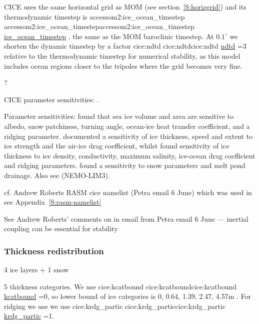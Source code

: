 \documentclass[11pt]{article}
\makeatletter
\newcommand{\TODO}[1]{\note{\textcolor{blue}{\textsf{\textbf{TODO: #1}}}}}
\newcommand*{\make@hex@label}[1]{%
  \def\hex@label{#1}%
  \@onelevel@sanitize\hex@label
  \EdefEscapeHex\hex@label{\hex@label}%
}
\newcommand*{\hexhyperlink}[2]{%
  \make@hex@label{#1}%
  \hyperlink{\hex@label}{#2}%
}
\newcommand{\cicelink}[2]{\hexhyperlink{cice:#2}{#1}}
\newcommand{\accessomlink}[2]{\hexhyperlink{accessom2:#2}{#1}}
\newcommand{\param}[1]{\textsf{#1}}
\newcommand{\cice}[1]{\param{\cicelink{#1}{#1}}}
\newcommand{\accessom}[1]{\param{\accessomlink{#1}{#1}}}
\makeatother
\begin{document}
CICE uses the same horizontal grid as MOM (see section~\ref{S:horizgrid}) and its thermodynamic timestep is \accessom{ice_ocean_timestep}, the same as the MOM baroclinic timestep.
At $0.1^\circ$ we shorten the dynamic timestep by a factor \cice{ndtd}=3 relative to the thermodynamic timestep for numerical stability, as this model includes ocean regions closer to the tripoles where the grid becomes very fine.

\citet{BaileyETAL2018a}?

CICE parameter sensitivities: \citet{Hunke2010a}.

Parameter sensitivities: \citet{UotilaOFarrellMarslandBi2012a} found that sea ice volume and area are sensitive to albedo, snow patchiness, turning angle, ocean-ice heat transfer coefficient, and a ridging parameter. 
\citet{MillerLaxonFelthamCresswell2006a} documented a sensitivity of ice thickness, speed and extent to ice strength and the air-ice drag coefficient, whilst \citet{KimHunkeLipscomb2006a} found sensitivity of ice thickness to ice density, conductivity, maximum salinity, ice-ocean drag coefficient and ridging parameters. 
\citet{UrregoBlancoUrbanHunkeTurnerJeffery2016a} found a sensitivity to snow parameters and melt pond drainage.
Also see \citet{MassonnetGoosseFichefetCounillon2014a} (NEMO-LIM3).

cf. Andrew Roberts RASM cice namelist (Petra email 6 June) \TODO{get permisssion}
which was used in \citet{RobertsCraigMaslowskiOsinskiDuvivierHughesNijssenCassanoBrunke2015a, CassanoDuVivierRobertsHughesSeefeldtBrunkeCraigFiselGutowski2017a, HammanNijssenRobertsCraigMaslowskiOsinski2017a, JinDealMaslowskiMatraiRobertsOsinskiLeeFrantsElliott2018a, RobertsHunkeAllardBaileyCraigLemieuxTurner2018a}
see Appendix~\ref{S:rasm-namelist}

See Andrew Roberts' comments on \citet{RobertsCraigMaslowskiOsinskiDuvivierHughesNijssenCassanoBrunke2015a} in email from Petra email 6 June --- inertial coupling can be essential for stability

\subsubsection{Thickness redistribution}

4 ice layers + 1 snow

5 thickness categories. 
We use \cice{kcatbound}=0, so lower bound of ice categories is 0, 0.64, 1.39, 2.47, 4.57m \citep[][table 2]{HunkeLipscombTurnerJefferyElliott2015a-CICE5p1}.
For ridging we use we use \cice{krdg_partic}=1.
\end{document}
